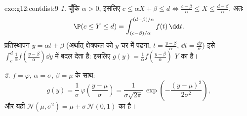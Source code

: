 \begin{solution}{exo:g12:contdist:9}
\emph{1.} चूँकि $\alpha > 0$, इसलिए $c \leq \alpha X + \beta \leq d
\iff \frac{c - \beta}{\alpha} \leq X \leq \frac{d - \beta}{\alpha}$, अतः
\[
\P(c \leq Y \leq d)
= \int_{(c-\beta)/\alpha}^{(d-\beta)/\alpha} f(t)\,\dd t .
\]
प्रतिस्थापन $y = \alpha t + \beta$ (अर्थात् क्षेत्रफल को $y$ चर में पढ़ना, $t = \frac{y - \beta}{\alpha}$, $\dd t = \frac{\dd y}{\alpha}$) इसे
$\int_c^d \frac{1}{\alpha} f\left(\frac{y-\beta}{\alpha}\right)\dd y$ में बदल देता है: इसलिए  $g(y) = \frac1\alpha f\left(\frac{y-\beta}{\alpha}\right)$ $Y$ का  है।

\emph{2.} $f = \varphi$, $\alpha = \sigma$, $\beta = \mu$ के साथ:
\[
g(y) = \frac{1}{\sigma}\,\varphi\!\left(\frac{y - \mu}{\sigma}\right)
= \frac{1}{\sigma\sqrt{2\pi}}\,
\exp\left(-\frac{(y-\mu)^2}{2\sigma^2}\right),
\]
और यही $\mathcal N(\mu, \sigma^2) = \mu + \sigma\,\mathcal N(0,1)$ का  है।
\end{solution}

